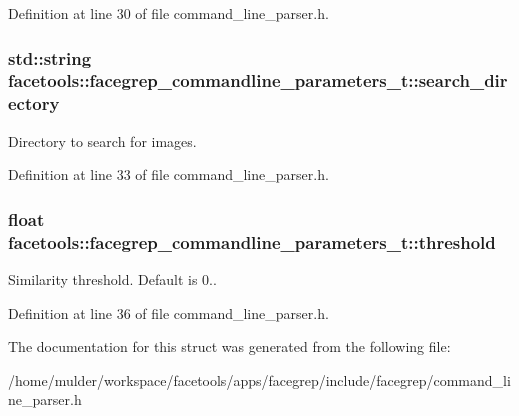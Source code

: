 Definition at line 30 of file command\+\_\+line\+\_\+parser.\+h.

\subsubsection[{\texorpdfstring{search\+\_\+directory}{search_directory}}]{\setlength{\rightskip}{0pt plus 5cm}std\+::string facetools\+::facegrep\+\_\+commandline\+\_\+parameters\+\_\+t\+::search\+\_\+directory}\hypertarget{structfacetools_1_1facegrep__commandline__parameters__t_a5b07147c1e2f887aaf5d65a2377c6ef6}{}\label{structfacetools_1_1facegrep__commandline__parameters__t_a5b07147c1e2f887aaf5d65a2377c6ef6}
Directory to search for images. 

Definition at line 33 of file command\+\_\+line\+\_\+parser.\+h.

\subsubsection[{\texorpdfstring{threshold}{threshold}}]{\setlength{\rightskip}{0pt plus 5cm}float facetools\+::facegrep\+\_\+commandline\+\_\+parameters\+\_\+t\+::threshold}\hypertarget{structfacetools_1_1facegrep__commandline__parameters__t_accf855e98c9c61398fee6ba8cb97eb05}{}\label{structfacetools_1_1facegrep__commandline__parameters__t_accf855e98c9c61398fee6ba8cb97eb05}
Similarity threshold. Default is 0.. 

Definition at line 36 of file command\+\_\+line\+\_\+parser.\+h.



The documentation for this struct was generated from the following file\+:\begin{DoxyCompactItemize}
\item 
/home/mulder/workspace/facetools/apps/facegrep/include/facegrep/command\+\_\+line\+\_\+parser.\+h\end{DoxyCompactItemize}
